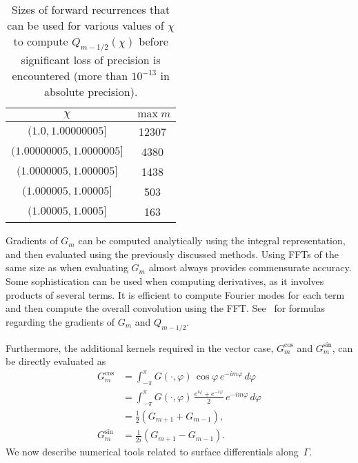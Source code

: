 \documentclass[11pt]{article}
\renewcommand{\phi}{\varphi}
\numberwithin{equation}{section}
\begin{document}
\begin{table}[!t]
  \begin{center}
    \caption{Sizes of forward recurrences that can be used for various
      values of $\chi$ to compute $Q_{m-1/2}(\chi)$ before
      significant loss of precision is encountered (more than
      $10^{-13}$ in absolute precision).}
  \label{tab_fwdrec}
    \begin{tabular}{|c|c|} \hline
      $\chi$  &  $\max m$ \\ \hline
      $(1.0,1.00000005]$ & 12307 \\ \hline
      $(1.00000005,1.0000005]$ & 4380 \\ \hline
      $(1.0000005,1.000005]$ & 1438 \\ \hline
      $(1.000005,1.00005]$ & 503 \\ \hline
      $(1.00005,1.0005]$ & 163 \\ \hline
    \end{tabular}
  \end{center}
\end{table}

Gradients of $G_m$ can be computed analytically using the integral
representation, and then evaluated using the previously discussed
methods. Using FFTs of the same size as when evaluating $G_m$ almost
always provides commensurate accuracy. Some sophistication can be used
when computing derivatives, as it involves products of several
terms. It is efficient to compute Fourier modes for each term and then
compute the overall convolution using the FFT. See~\cite{helsing_2014,
  young} for formulas regarding the gradients of $G_m$ and
$Q_{m-1/2}$.

Furthermore, the additional kernels required in the vector case,
$G^{\cos}_m$ and $G_m^{\sin}$, can be directly evaluated as
\begin{equation}
  \label{eq_modulated}
  \begin{aligned}
G_m^{\cos}  &= \int_{-\pi}^\pi G(\cdot,\phi) \, \cos\phi
\, e^{-im\phi} \, d\phi \\
&= \int_{-\pi}^\pi G(\cdot,\phi) \, \frac{e^{i\phi} + e^{-i\phi}}{2}
\, e^{-im\phi} \, d\phi \\
&= \frac{1}{2}\left( G_{m+1} 
+ G_{m-1} \right), \\
G_m^{\sin}  &= \frac{1}{2i}\left( G_{m+1} 
- G_{m-1} \right).
  \end{aligned}
\end{equation}
We now describe numerical tools related to surface differentials
along~$\Gamma$.
\end{document}
